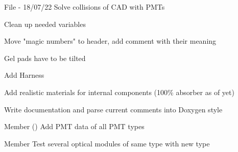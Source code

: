 \begin{DoxyRefList}
\item[File \doxylink{_o_m_sim_l_o_m18_8cc}{OMSim\+LOM18.cc} ]\label{todo__todo000006}%
%
-\/ 18/07/22 Solve collisions of CAD with PMTs
\begin{DoxyItemize}
\item Clean up needed variables
\item Move "{}magic numbers"{} to header, add comment with their meaning
\item Gel pads have to be tilted
\item Add Harness
\item Add realistic materials for internal components (100\% absorber as of yet)
\item Write documentation and parse current comments into Doxygen style  
\end{DoxyItemize}
\item[Member \doxylink{class_o_m_sim_p_m_t_response_a80b379bc78ca06d23011703aae3341d7}{OMSim\+PMTResponse\+::OMSim\+PMTResponse} ()]\label{todo__todo000001}%
%
Add PMT data of all PMT types  
\item[Member \doxylink{class_o_m_sim_sensitive_detector_a8a0377d3ae13a48c1b3b08cd56bfaa08}{OMSim\+Sensitive\+Detector\+::m\+\_\+boundary\+Process} ]\label{todo__todo000002}%
%
Test several optical modules of same type with new type 
\end{DoxyRefList}